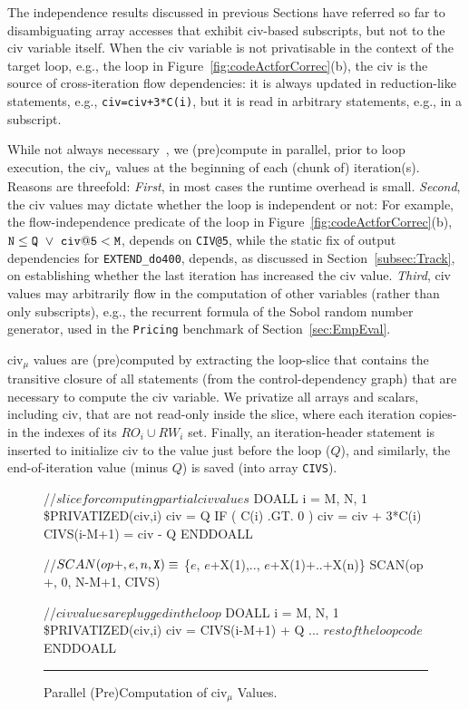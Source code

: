 \documentclass{sig-alternate}
\newcommand{\mymath}[1]{$ #1 $}
\begin{document}
The independence results discussed in previous Sections have referred 
so far to disambiguating array accesses that exhibit {\sc civ}-based subscripts, 
but not to the {\sc civ} variable itself.
%
When the {\sc civ} variable is not privatisable in the context of the 
target loop, e.g., the loop in Figure~\ref{fig:codeActforCorrec}(b), 
the {\sc civ} is the source of cross-iteration flow dependencies: %
it is always updated in reduction-like statements, e.g., {\tt civ=civ+3*C(i)},
but it is read in arbitrary statements, e.g., in a subscript.


While not always necessary~\cite{PaduaStackArr}, we  (pre)compute in %
parallel, prior to loop execution, the {\sc civ}$_\mu$ values at the beginning 
of each (chunk of) iteration(s).
Reasons are threefold: {\em First}, in most cases %
the runtime overhead is small. {\em Second}, the {\sc civ} values may dictate
whether the loop is independent or not: For example,  the flow-independence
predicate of the loop in Figure~\ref{fig:codeActforCorrec}(b), 
${\tt N} \le {\tt Q}~\vee~{\tt civ@5} < {\tt M}$,
depends on {\tt CIV@5}, while the
static fix of output dependencies for {\tt EXTEND\_do400}, depends, as
discussed in Section~\ref{subsec:Track}, on establishing whether the last
iteration has increased the {\sc civ} value. 
%
{\em Third}, {\sc civ} values may arbitrarily flow in the computation
of other variables (rather than only subscripts), e.g., the recurrent
formula of the Sobol random number generator, used in the {\tt Pricing}
benchmark of Section~\ref{sec:EmpEval}.

{\sc civ}$_\mu$ values are (pre)computed by extracting the loop-slice
that contains the transitive closure of all statements (from the 
control-dependency graph) 
that are necessary to compute the {\sc civ} variable. 
We privatize all arrays and scalars, including {\sc civ}, that are not 
read-only inside the slice, where each iteration copies-in the  indexes 
of its $RO_i \cup RW_i$ set. Finally, an iteration-header statement is 
inserted to initialize {\sc civ} to the value just before the loop ($Q$), 
and similarly, the end-of-iteration value (minus $Q$) is saved (into  
array {\tt CIVS}).  


\begin{figure}
\begin{colorcode}
//\mymath{slice for computing partial civ values}
DOALL i = M, N, 1      \$PRIVATIZED(civ,i)
  civ = Q
  IF ( C(i) .GT. 0 ) civ = civ + 3*C(i)
  CIVS(i-M+1) = civ - Q
ENDDOALL

//\mymath{SCAN(op {\tt{}+}, e, n, {\tt{}X}) \equiv} \{\mymath{e}, \mymath{e}+X(1),.., \mymath{e}+X(1)+..+X(n)\}
SCAN(op +, 0, N-M+1, CIVS)

//\mymath{civ values are plugged in the loop}
DOALL i = M, N, 1      \$PRIVATIZED(civ,i)
  civ = CIVS(i-M+1) + Q
  ... \mymath{rest of the loop code}
ENDDOALL
\end{colorcode}
\vspace{-1ex}
\hrule
\vspace{-0.5ex}
\caption{ Parallel (Pre)Computation of {\sc civ}$_\mu$ Values.}
\label{fig:CivSlice} %
\end{figure}
\end{document}
